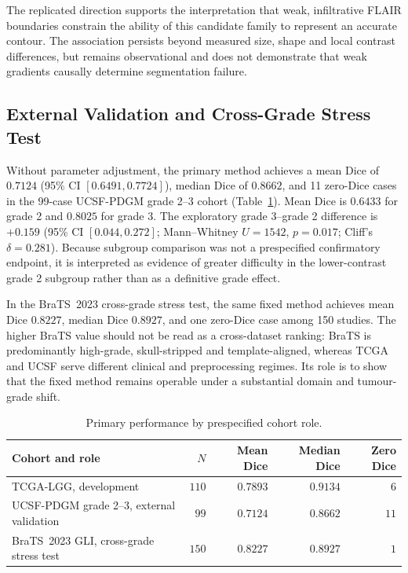 \documentclass[11pt,a4paper]{article}
\begin{document}
The replicated direction supports the interpretation that weak, infiltrative
FLAIR boundaries constrain the ability of this candidate family to represent an
accurate contour. The association persists beyond measured size, shape and local
contrast differences, but remains observational and does not demonstrate that
weak gradients causally determine segmentation failure.

\subsection{External Validation and Cross-Grade Stress Test}\label{sec:ucsf-validation}

Without parameter adjustment, the primary method achieves a mean Dice of $0.7124$
(95\% CI $[0.6491,0.7724]$), median Dice of $0.8662$, and 11 zero-Dice cases in
the 99-case UCSF-PDGM grade 2--3 cohort (Table~\ref{tab:results}). Mean Dice is
$0.6433$ for grade 2 and $0.8025$ for grade 3. The exploratory grade 3--grade 2
difference is $+0.159$ (95\% CI $[0.044,0.272]$; Mann--Whitney $U=1542$,
$p=0.017$; Cliff's $\delta=0.281$). Because subgroup comparison was not a
prespecified confirmatory endpoint, it is interpreted as evidence of greater
difficulty in the lower-contrast grade 2 subgroup rather than as a definitive
grade effect.

In the BraTS~2023 cross-grade stress test, the same fixed method achieves mean
Dice $0.8227$, median Dice $0.8927$, and one zero-Dice case among 150 studies.
The higher BraTS value should not be read as a cross-dataset ranking: BraTS is
predominantly high-grade, skull-stripped and template-aligned, whereas TCGA and
UCSF serve different clinical and preprocessing regimes. Its role is to show that
the fixed method remains operable under a substantial domain and tumour-grade
shift.

\begin{table}[htbp]\centering
\caption{Primary performance by prespecified cohort role.}\label{tab:results}
\begin{tabular}{lrrrr}
\toprule
Cohort and role & $N$ & Mean Dice & Median Dice & Zero Dice \\
\midrule
TCGA-LGG, development & $110$ & $0.7893$ & $0.9134$ & $6$ \\
UCSF-PDGM grade 2--3, external validation & $99$ & $0.7124$ & $0.8662$ & $11$ \\
BraTS~2023 GLI, cross-grade stress test & $150$ & $0.8227$ & $0.8927$ & $1$ \\
\bottomrule
\end{tabular}
\end{table}
\end{document}
